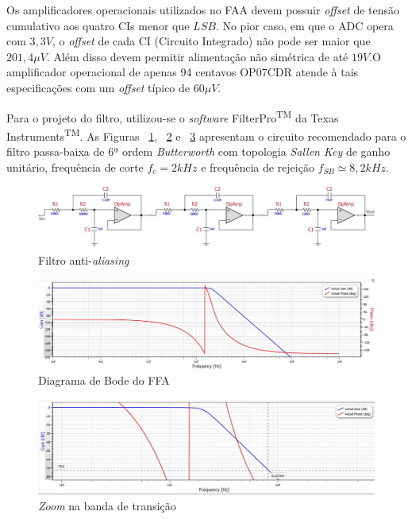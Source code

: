 \documentclass[11pt]{abntex2}
\begin{document}
				Os amplificadores operacionais utilizados no FAA devem
				possuir \textit{offset} de tensão cumulativo aos quatro CIs
				menor que $LSB$. No pior caso, em que o ADC opera com $3,3V$,
				o \textit{offset} de cada CI (Circuito Integrado) não pode ser
				maior que $201,4\mu V$. Além disso devem permitir alimentação
				não simétrica de até $19V$.O amplificador operacional de apenas
				94 centavos OP07CDR atende à tais especificações com um \textit{offset}
				típico de $60\mu V$.

				Para o projeto do filtro, utilizou-se o \textit{software}
				FilterPro\textsuperscript{TM} da Texas
				Instruments\textsuperscript{TM}. As Figuras ~\ref{fig:circuitoFAA},
				~\ref{fig:faaDiagramaBode} e ~\ref{fig:faaDiagramaBodeZoom} apresentam o
				circuito recomendado para o filtro passa-baixa de 6ª ordem
				\textit{Butterworth} com topologia \textit{Sallen Key} de ganho
				unitário, frequência de corte $f_c = 2kHz$ e frequência de
				rejeição $f_{SB}\simeq 8,2kHz$.

				\begin{figure}[!ht]
					\centering
					\includegraphics[width=\linewidth]{../../Fotos/filterPro.jpg}
					\caption{Filtro anti-\textit{aliasing}}
					\label{fig:circuitoFAA}
				\end{figure}

				\begin{figure}[!ht]
					\centering
					\includegraphics[width=\linewidth]{../../Fotos/filterProGF.jpg}
					\caption{Diagrama de Bode do FFA}
					\label{fig:faaDiagramaBode}
				\end{figure}

				\begin{figure}[!ht]
					\centering
					\includegraphics[width=\linewidth]{../../Fotos/filterProZoom.jpg}
					\caption{\textit{Zoom} na banda de transição}
					\label{fig:faaDiagramaBodeZoom}
				\end{figure}
\end{document}
